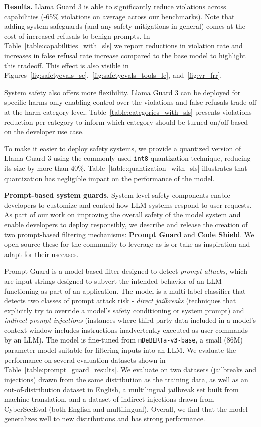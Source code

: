\textbf{Results.} 
Llama Guard 3 is able to significantly reduce violations across capabilities (-65\% violations on average across our benchmarks). Note that adding system safeguards (and any safety mitigations in general) comes at the cost of increased refusals to benign prompts. In Table~\ref{table:capabilities_with_sls} we report reductions in violation rate and increases in false refusal rate increase compared to the base model to highlight this tradeoff.  This effect is also visible in Figures~\ref{fig:safetyevals_sc},~\ref{fig:safetyevals_tools_lc}, and~\ref{fig:vr_frr}.

System safety also offers more flexibility. Llama Guard 3 can be deployed for specific harms only enabling control over the violations and false refusals trade-off at the harm category level. Table~\ref{table:categories_with_sls} presents violations reduction per category to inform which category should be turned on/off based on the developer use case.

To make it easier to deploy safety systems, we provide a quantized version of Llama Guard 3 using the commonly used \texttt{int8} quantization technique, reducing its size by more than 40\%. Table~\ref{table:quantization_with_sls} illustrates that quantization has negligible impact on the performance of the model.

\textbf{Prompt-based system guards.} System-level safety components enable developers to customize and control how LLM systems respond to user requests. As part of our work on improving the overall safety of the model system and enable developers to deploy responsibly, we describe and release the creation of two prompt-based filtering mechanisms: \textbf{Prompt Guard} and \textbf{Code Shield}. We open-source these for the community to leverage as-is or take as inspiration and adapt for their usecases. 

Prompt Guard is a model-based filter designed to detect \textit{prompt attacks}, which are input strings designed to subvert the intended behavior of an LLM functioning as part of an application. The model is a multi-label classifier that detects two classes of prompt attack risk - \textit{direct jailbreaks} (techniques that explicitly try to override a model's safety conditioning or system prompt) and \textit{indirect prompt injections} (instances where third-party data included in a model's context window includes instructions inadvertently executed as user commands by an LLM). The model is fine-tuned from \texttt{mDeBERTa-v3-base}, a small (86M) parameter model suitable for filtering inputs into an LLM. We evaluate the performance on several evaluation datasets shown in Table~\ref{table:prompt_guard_results}. We evaluate on two datasets (jailbreaks and injections) drawn from the same distribution as the training data, as well as an out-of-distribution dataset in English, a multilingual jailbreak set built from machine translation, and a dataset of indirect injections drawn from CyberSecEval (both English and multilingual). Overall, we find that the model generalizes well to new distributions and has strong performance. 

